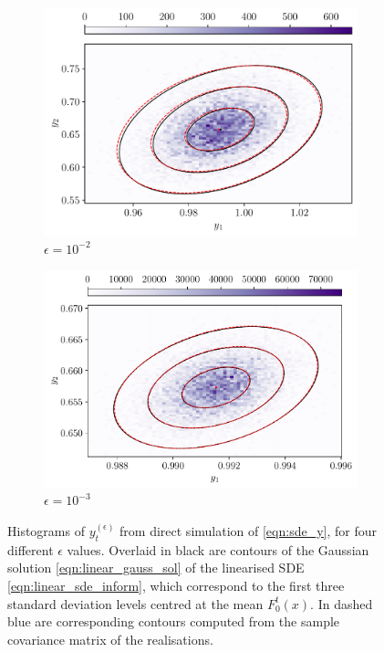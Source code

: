 \begin{figure}
\begin{center}
		\begin{subfigure}{0.49\textwidth}
			\includegraphics[width=\textwidth]{chp04_paper_numerics/figures/rossby/hist_0.010000000000000002.pdf}
			\caption{\(\epsilon = 10^{-2}\)}
			\label{fig:y_hists_c}
		\end{subfigure}
		\begin{subfigure}{0.49\textwidth}
			\includegraphics[width=\textwidth]{chp04_paper_numerics/figures/rossby/hist_0.001.pdf}
			\caption{\(\epsilon = 10^{-3}\)}
			\label{fig:y_hists_d}
		\end{subfigure}
		\caption{Histograms of \(y_t^{(\epsilon)}\) from direct simulation of \eqref{eqn:sde_y}, for four different \(\epsilon\) values.
		Overlaid in black are contours of the Gaussian solution \eqref{eqn:linear_gauss_sol} of the linearised SDE \eqref{eqn:linear_sde_inform}, which correspond to the first three standard deviation levels centred at the mean \(F_0^t(x)\).
        In dashed blue are corresponding contours computed from the sample covariance matrix of the realisations.
        }
		\label{fig:y_hists}
	\end{center}
\end{figure}
